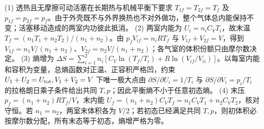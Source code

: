 (1) 透热且无摩擦可动活塞在长期热与机械平衡下要求 \(T_{1f}=T_{2f}=T_f\) 及 \(p_{1f}=p_{2f}=p_f\)。由于外壳既不与外界换热也不对外做功，整个气体总内能保持不变；活塞移动造成的两室内功彼此抵消。
(2) 两室内能为 \(U_i=n_iC_VT_i\)，故末温 \(T_f=(n_1T_1+n_2T_2)/(n_1+n_2)\)。由 \(p_fV_{if}=n_iRT_f\) 与 \(V_{1f}+V_{2f}=V\)，得到 \(V_{1f}=n_1V/(n_1+n_2)\)、\(V_{2f}=n_2V/(n_1+n_2)\)；各气室的体积份额只由摩尔数决定。
(3) 熵增为 \(\Delta S=\sum_{i=1}^2 n_i[C_V\ln(T_f/T_i)+R\ln(V_{if}/V_{ii})]\)。以每室内能和容积为变量，总熵函数对正温、正容积严格凹，约束 \(U_1+U_2=U_{\rm tot},V_1+V_2=V\) 下唯一极大点由 \(\partial S/\partial U_i=1/T_i\) 与 \(\partial S/\partial V_i=p_i/T_i\) 的拉格朗日乘子条件给出共同 \(T,p\)；因此平衡熵不小于任意初态熵。
(4) 末压 \(p_f=(n_1+n_2)RT_f/V\)，末内能 \(U_f=(n_1+n_2)C_VT_f=n_1C_VT_1+n_2C_VT_2\)，核对守恒。若 \(n_1=n_2\)，两室末体积各为 \(V/2\)；若初态已经满足共同 \(T,p\)，则初体积必按摩尔数分配，所有末态等于初态，熵增严格为零。
